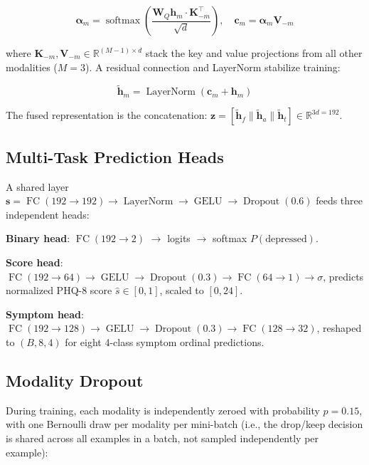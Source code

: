 \documentclass[journal]{IEEEtran}
\begin{document}
\begin{equation}
\boldsymbol{\alpha}_m =
  \operatorname{softmax}\!\!\left(\frac{\mathbf{W}_Q\mathbf{h}_m\cdot
  \mathbf{K}_{-m}^\top}{\sqrt{d}}\right),
\quad
\mathbf{c}_m = \boldsymbol{\alpha}_m \mathbf{V}_{-m}
\label{eq:attention}
\end{equation}

where $\mathbf{K}_{-m},\mathbf{V}_{-m}\in\mathbb{R}^{(M-1)\times d}$
stack the key and value projections from all other modalities
($M=3$). A residual connection and LayerNorm stabilize training:

\begin{equation}
\tilde{\mathbf{h}}_m = \operatorname{LayerNorm}(\mathbf{c}_m + \mathbf{h}_m)
\label{eq:residual}
\end{equation}

The fused representation is the concatenation:
$\mathbf{z} = [\tilde{\mathbf{h}}_f \| \tilde{\mathbf{h}}_a \|
\tilde{\mathbf{h}}_t] \in \mathbb{R}^{3d=192}$.

\subsection{Multi-Task Prediction Heads}

A shared layer $\mathbf{s}=\operatorname{FC}(192\!\to\!192)
\to\operatorname{LayerNorm}\to\operatorname{GELU}\to\operatorname{Dropout}(0.6)$
feeds three independent heads:

\textbf{Binary head}: $\operatorname{FC}(192\!\to\!2)$ $\to$ logits
$\to$ softmax $P(\text{depressed})$.

\textbf{Score head}: $\operatorname{FC}(192\!\to\!64)
\to\operatorname{GELU}\to\operatorname{Dropout}(0.3)
\to\operatorname{FC}(64\!\to\!1)\to\sigma$,
predicts normalized PHQ-8 score $\hat{s}\in[0,1]$, scaled to $[0,24]$.

\textbf{Symptom head}: $\operatorname{FC}(192\!\to\!128)
\to\operatorname{GELU}\to\operatorname{Dropout}(0.3)
\to\operatorname{FC}(128\!\to\!32)$, reshaped to $(B,8,4)$
for eight 4-class symptom ordinal predictions.

\subsection{Modality Dropout}

During training, each modality is independently zeroed with
probability $p=0.15$, with one Bernoulli draw per modality per
mini-batch (i.e., the drop/keep decision is shared across all
examples in a batch, not sampled independently per example):
\end{document}
